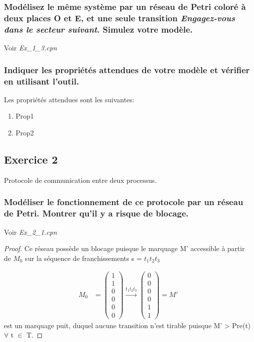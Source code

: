 \documentclass[french]{article}
\begin{document}
\subsubsection{Modélisez le même système par un réseau de Petri coloré à deux places O et E, et une seule transition 
\textit{Engagez-vous dans le secteur suivant}. Simulez votre modèle.}
Voir \textit{Ex\_1\_3.cpn}
\subsubsection{Indiquer les propriétés attendues de votre modèle et vérifier en utilisant l’outil.}
Les propriétés attendues sont les suivantes:
\begin{enumerate}
	\item Prop1
	\item Prop2
\end{enumerate}



\subsection{Exercice 2}
Protocole de communication entre deux processus.
\subsubsection{Modéliser le fonctionnement de ce protocole par un réseau de Petri. Montrer qu’il y a risque de 
blocage.}
Voir \textit{Ex\_2\_1.cpn}
\begin{proof}
Ce réseau possède un blocage puisque le marquage M' accessible à partir de $M_0$ sur la séquence de franchissements s = $t_1 
t_2 t_3$

\begin{align*}
M_0 &= \begin{pmatrix} 
	1 \\ 
	1 \\ 
	0 \\
	0 \\
	0 \\
	0   
\end{pmatrix} \xrightarrow{t_1 t_2 t_3} 
\begin{pmatrix} 
	0 \\ 
	0 \\ 
	0 \\
	0 \\
	1 \\
	1   
\end{pmatrix} = M'
\end{align*}
est un marquage puit, duquel aucune transition n'est tirable puisque M' > Pre(t) $\forall$ t $\in$ T.
\end{proof}
\end{document}

